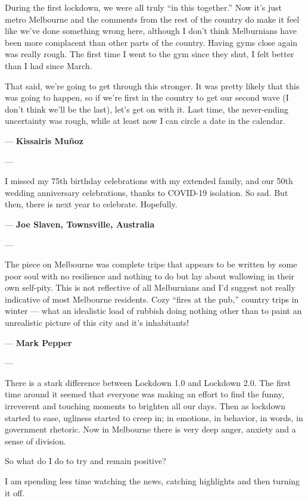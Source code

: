 During the first lockdown, we were all truly ``in this together.'' Now
it's just metro Melbourne and the comments from the rest of the country
do make it feel like we've done something wrong here, although I don't
think Melburnians have been more complacent than other parts of the
country. Having gyms close again was really rough. The first time I went
to the gym since they shut, I felt better than I had since March.

That said, we're going to get through this stronger. It was pretty
likely that this was going to happen, so if we're first in the country
to get our second wave (I don't think we'll be the last), let's get on
with it. Last time, the never-ending uncertainty was rough, while at
least now I can circle a date in the calendar.

--- \textbf{Kissairis Muñoz}

---

I missed my 75th birthday celebrations with my extended family, and our
50th wedding anniversary celebrations, thanks to COVID-19 isolation. So
sad. But then, there is next year to celebrate. Hopefully.

--- \textbf{Joe Slaven, Townsville, Australia}

---

The piece on Melbourne was complete tripe that appears to be written by
some poor soul with no resilience and nothing to do but lay about
wallowing in their own self-pity. This is not reflective of all
Melburnians and I'd suggest not really indicative of most Melbourne
residents. Cozy ``fires at the pub,'' country trips in winter --- what
an idealistic load of rubbish doing nothing other than to paint an
unrealistic picture of this city and it's inhabitants!

--- \textbf{Mark Pepper}

---

There is a stark difference between Lockdown 1.0 and Lockdown 2.0. The
first time around it seemed that everyone was making an effort to find
the funny, irreverent and touching moments to brighten all our days.
Then as lockdown started to ease, ugliness started to creep in; in
emotions, in behavior, in words, in government rhetoric. Now in
Melbourne there is very deep anger, anxiety and a sense of division.

So what do I do to try and remain positive?

I am spending less time watching the news, catching highlights and then
turning it off.

